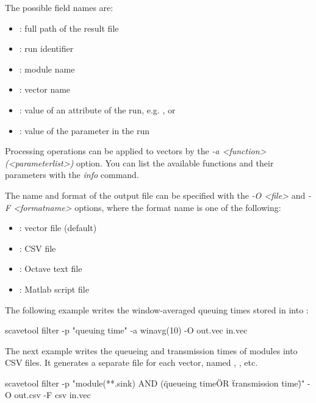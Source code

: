 The possible field names are:

\begin{itemize}
    \item{}: full path of the result file
    \item{}: run identifier
    \item{}: module name
    \item{}: vector name
    \item{}: value of an attribute of the run,
        e.g. ,  or 
    \item{}: value of the parameter in the run
\end{itemize}

Processing operations can be applied to vectors by the
\textit{-a <function>(<parameterlist>)} option. You can list
the available functions and their parameters with the \textit{info} command.

The name and format of the output file can be specified with the
\textit{-O <file>} and \textit{-F <formatname>} options, where
the format name is one of the following:

\begin{itemize}
    \item{}: vector file (default)
    \item{}: CSV file
    \item{}: Octave text file
    \item{}: Matlab script file
\end{itemize}

The following example writes the window-averaged queuing times stored
in  into :

\begin{commandline}
scavetool filter -p "queuing time" -a winavg(10) -O out.vec in.vec
\end{commandline}

The next example writes the queueing and transmission times of 
modules into CSV files. It generates a separate file for each vector,
named , , etc.

\begin{commandline}
scavetool filter -p "module(**.sink) AND
                    (\"queueing time\" OR \"transmission time\")"
                 -O out.csv -F csv in.vec
\end{commandline}

